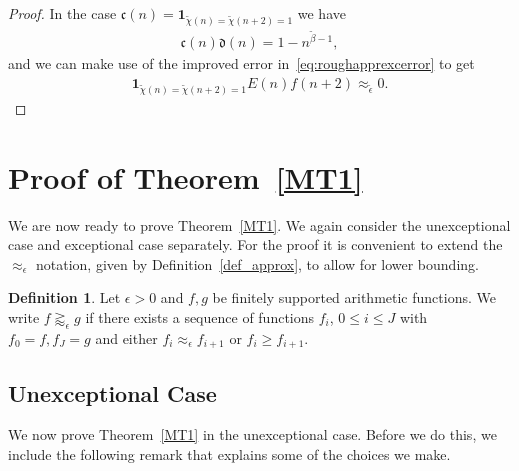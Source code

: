 \documentclass[12pt]{amsart}
\theoremstyle{definition}
\newtheorem{definition}[theorem]{Definition}
\theoremstyle{remark}
\numberwithin{equation}{section}
\newcommand{\1}{\mathbf{1}}
\begin{document}
\begin{proof}
    In the case $\mathfrak{c}(n)=\1_{\widetilde{\chi}(n)=\widetilde{\chi}(n+2)=1}$ we have
    \begin{align*}
      \mathfrak{c}(n)\mathfrak{d}(n)=1-n^{\widetilde{\beta}-1},
    \end{align*}
    and we can make use of the improved error in~\eqref{eq:roughapprexcerror} to get
    \begin{align*}
        \1_{\widetilde{\chi}(n)=\widetilde{\chi}(n+2)=1}E(n)f(n+2)\approx_{\widetilde{\epsilon} }0.
    \end{align*}

\end{proof}



	\section{Proof of Theorem~\ref{MT1}}\label{sec:final}
	
	We are now ready to prove Theorem~\ref{MT1}. We again consider the unexceptional case and exceptional case separately. For the proof it is convenient to extend the $\approx_\epsilon$ notation, given by Definition~\ref{def_approx}, to allow for lower bounding.
\begin{definition}\label{def:greaterapprox}
    Let $\epsilon>0$ and $f,g$ be finitely supported arithmetic functions. We write $f \gtrapprox_{\epsilon} g$ if there exists a sequence of functions $f_i$, $0\leq i \leq J$ with $f_0=f, f_J=g$ and either $f_i \approx_\epsilon f_{i+1}$ or $f_i\geq f_{i+1}$.
\end{definition}
	
	\subsection{Unexceptional Case}
	We now prove Theorem~\ref{MT1} in the unexceptional case. Before we do this, we include the following remark that explains some of the choices we make. 
\end{document}
